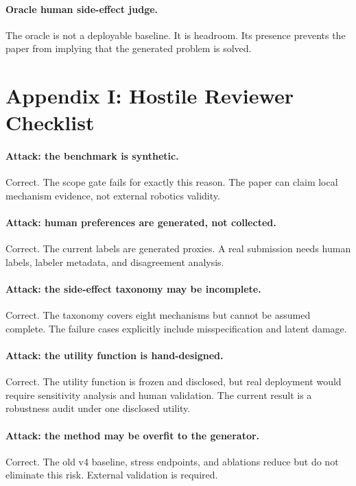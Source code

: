 \documentclass{article}
\begin{document}
\paragraph{Oracle human side-effect judge.}
The oracle is not a deployable baseline. It is headroom. Its presence prevents the paper from implying that the generated problem is solved.

\clearpage
\section*{Appendix I: Hostile Reviewer Checklist}
\paragraph{Attack: the benchmark is synthetic.}
Correct. The scope gate fails for exactly this reason. The paper can claim local mechanism evidence, not external robotics validity.

\paragraph{Attack: human preferences are generated, not collected.}
Correct. The current labels are generated proxies. A real submission needs human labels, labeler metadata, and disagreement analysis.

\paragraph{Attack: the side-effect taxonomy may be incomplete.}
Correct. The taxonomy covers eight mechanisms but cannot be assumed complete. The failure cases explicitly include misspecification and latent damage.

\paragraph{Attack: the utility function is hand-designed.}
Correct. The utility function is frozen and disclosed, but real deployment would require sensitivity analysis and human validation. The current result is a robustness audit under one disclosed utility.

\paragraph{Attack: the method may be overfit to the generator.}
Correct. The old v4 baseline, stress endpoints, and ablations reduce but do not eliminate this risk. External validation is required.
\end{document}

